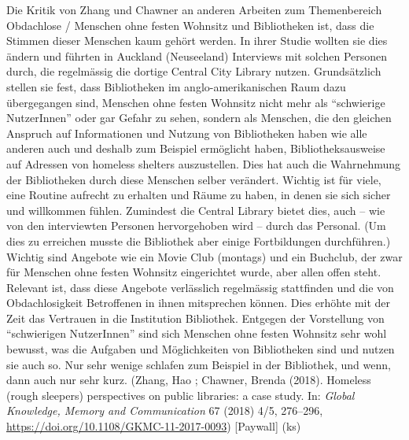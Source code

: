\documentclass[a4paper,
fontsize=11pt,
oneside,
numbers=noperiodatend,
parskip=half-,
bibliography=totoc,
final
]{scrartcl}
\begin{document}
Die Kritik von Zhang und Chawner an anderen Arbeiten zum Themenbereich
Obdachlose / Menschen ohne festen Wohnsitz und Bibliotheken ist, dass
die Stimmen dieser Menschen kaum gehört werden. In ihrer Studie wollten
sie dies ändern und führten in Auckland (Neuseeland) Interviews mit
solchen Personen durch, die regelmässig die dortige Central City Library
nutzen. Grundsätzlich stellen sie fest, dass Bibliotheken im
anglo-amerikanischen Raum dazu übergegangen sind, Menschen ohne festen
Wohnsitz nicht mehr als \enquote{schwierige NutzerInnen} oder gar Gefahr
zu sehen, sondern als Menschen, die den gleichen Anspruch auf
Informationen und Nutzung von Bibliotheken haben wie alle anderen auch
und deshalb zum Beispiel ermöglicht haben, Bibliotheksausweise auf
Adressen von homeless shelters auszustellen. Dies hat auch die
Wahrnehmung der Bibliotheken durch diese Menschen selber verändert.
Wichtig ist für viele, eine Routine aufrecht zu erhalten und Räume zu
haben, in denen sie sich sicher und willkommen fühlen. Zumindest die
Central Library bietet dies, auch -- wie von den interviewten Personen
hervorgehoben wird -- durch das Personal. (Um dies zu erreichen musste
die Bibliothek aber einige Fortbildungen durchführen.) Wichtig sind
Angebote wie ein Movie Club (montags) und ein Buchclub, der zwar für
Menschen ohne festen Wohnsitz eingerichtet wurde, aber allen offen
steht. Relevant ist, dass diese Angebote verlässlich regelmässig
stattfinden und die von Obdachlosigkeit Betroffenen in ihnen mitsprechen
können. Dies erhöhte mit der Zeit das Vertrauen in die Institution
Bibliothek. Entgegen der Vorstellung von \enquote{schwierigen
NutzerInnen} sind sich Menschen ohne festen Wohnsitz sehr wohl bewusst,
was die Aufgaben und Möglichkeiten von Bibliotheken sind und nutzen sie
auch so. Nur sehr wenige schlafen zum Beispiel in der Bibliothek, und
wenn, dann auch nur sehr kurz. (Zhang, Hao ; Chawner, Brenda (2018).
Homeless (rough sleepers) perspectives on public libraries: a case
study. In: \emph{Global Knowledge, Memory and Communication} 67 (2018)
4/5, 276--296, \url{https://doi.org/10.1108/GKMC-11-2017-0093})
{[}Paywall{]} (ks)
\end{document}
